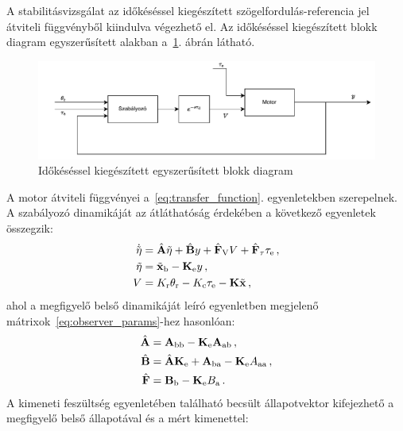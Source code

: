 A stabilitásvizsgálat az időkéséssel kiegészített szögelfordulás-referencia jel átviteli függvényből 
kiindulva végezhető el. Az időkéséssel kiegészített blokk diagram egyszerűsített alakban 
a~\ref{fig:block_diagram_time_delay}. ábrán látható.
\begin{figure}[ht]
    \begin{center}
    \includegraphics[width=\textwidth]{images/block_diagram_time_delay.pdf}
    \caption{Időkéséssel kiegészített egyszerűsített blokk diagram}\label{fig:block_diagram_time_delay}
    \end{center}
\end{figure}
A motor átviteli függvényei a~\eqref{eq:transfer_function}. egyenletekben szerepelnek. A szabályozó dinamikáját 
az átláthatóság érdekében a következő egyenletek összegzik:
\begin{equation}
    \begin{split}
        \dot{\tilde{\mathbf{\eta}}} &= \hat{\mathbf{A}} \tilde{\mathbf{\eta}} + \hat{\mathbf{B}} y + \hat{\mathbf{F}}_{\mathrm{V}} V + \hat{\mathbf{F}}_{\mathrm{\tau}} \tau_{\mathrm{e}}\,, \\
        \tilde{\mathbf{\eta}} &= \tilde{\mathbf{x}}_{\mathrm{b}} - \mathbf{K}_{\mathrm{e}} y\,, \\
        V &= K_{\mathrm{r}} \theta_{\mathrm{r}} - K_{\mathrm{c}} \tau_{\mathrm{e}} - \mathbf{K} \tilde{\mathbf{x}}\,,
    \end{split}
\end{equation}
ahol a megfigyelő belső dinamikáját leíró egyenletben megjelenő mátrixok~\eqref{eq:observer_params}-hez hasonlóan:
\begin{align}
    \begin{split}
        \hat{\mathbf{A}} &= \mathbf{A}_{\mathrm{bb}} - \mathbf{K}_{\mathrm{e}} \mathbf{A}_{\mathrm{ab}}\,,\\
        \hat{\mathbf{B}} &= \hat{\mathbf{A}} \mathbf{K}_{\mathrm{e}} + \mathbf{A}_{\mathrm{ba}} - \mathbf{K}_{\mathrm{e}} A_{\mathrm{aa}}\,,\\
        \hat{\mathbf{F}} &= \mathbf{B}_{\mathrm{b}} - \mathbf{K}_{\mathrm{e}} B_{\mathrm{a}}\,.
    \end{split}
\end{align}
A kimeneti feszültség egyenletében található becsült állapotvektor kifejezhető a megfigyelő belső állapotával és a mért kimenettel:
